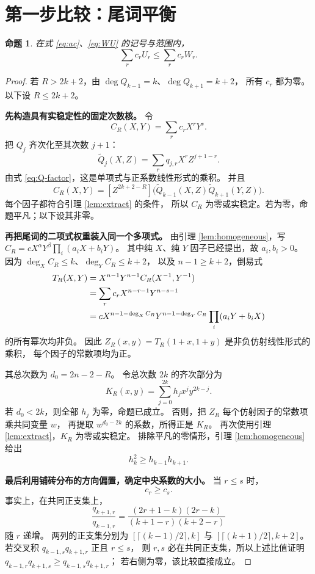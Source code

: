 \documentclass[UTF8,a4paper,11pt,fontset=none]{ctexart}
\numberwithin{equation}{section}
\theoremstyle{paperplain}
\newtheorem{proposition}[theorem]{命题}
\theoremstyle{definition}
\theoremstyle{remark}
\begin{document}
\section{第一步比较：尾词平衡}\label{sec:balance}
\begin{proposition}\label{prop:balance}
在式 \eqref{eq:ac}、\eqref{eq:WU} 的记号与范围内，
\begin{equation}\label{eq:balance}
\sum_r c_rU_r\le\sum_r c_rW_r.
\end{equation}
\end{proposition}
\begin{proof}
若 $R>2k+2$，由 $\deg Q_{k-1}=k$、$\deg Q_{k+1}=k+2$，
所有 $c_r$ 都为零。以下设 $R\le2k+2$。

\textbf{先构造具有实稳定性的固定次数核。}
令
\[
C_R(X,Y)=\sum_r c_rX^rY^s.
\]
把 $Q_j$ 齐次化至其次数 $j+1$：
\[
\widetilde Q_j(X,Z)=\sum_rq_{j,r}X^rZ^{j+1-r}.
\]
由式 \eqref{eq:Q-factor}，这是单项式与正系数线性形式的乘积。
并且
\[
C_R(X,Y)=[Z^{2k+2-R}]
\bigl(\widetilde Q_{k-1}(X,Z)\widetilde Q_{k+1}(Y,Z)\bigr).
\]
每个因子都符合引理 \ref{lem:extract} 的条件，
所以 $C_R$ 为零或实稳定。若为零，命题平凡；以下设其非零。

\textbf{再把尾词的二项式权重装入同一个多项式。}
由引理 \ref{lem:homogeneous}，写
$C_R=cX^\alpha Y^\beta\prod_i(a_iX+b_iY)$。
其中纯 $X$、纯 $Y$ 因子已经提出，故 $a_i,b_i>0$。
因为 $\deg_X C_R\le k$、$\deg_Y C_R\le k+2$，
以及 $n-1\ge k+2$，倒易式
\begin{align}
T_R(X,Y)
&=X^{n-1}Y^{n-1}C_R(X^{-1},Y^{-1})\notag\\
&=\sum_r c_rX^{n-r-1}Y^{n-s-1}\label{eq:T}\\
&=cX^{n-1-\deg_X C_R}Y^{n-1-\deg_Y C_R}
\prod_i(a_iY+b_iX)\notag
\end{align}
的所有幂次均非负。
因此 $Z_R(x,y)=T_R(1+x,1+y)$ 是非负仿射线性形式的乘积，
每个因子的常数项均为正。

其总次数为 $d_0=2n-2-R$。
令总次数 $2k$ 的齐次部分为
\[
K_R(x,y)=\sum_{j=0}^{2k}h_jx^jy^{2k-j}.
\]
若 $d_0<2k$，则全部 $h_j$ 为零，命题已成立。
否则，把 $Z_R$ 每个仿射因子的常数项乘共同变量 $w$，
再提取 $w^{d_0-2k}$ 的系数，所得正是 $K_R$。
再次使用引理 \ref{lem:extract}，$K_R$ 为零或实稳定。
排除平凡的零情形，引理 \ref{lem:homogeneous} 给出
\begin{equation}\label{eq:h-lc}
h_k^2\ge h_{k-1}h_{k+1}.
\end{equation}

\textbf{最后利用铺砖分布的方向偏置，确定中央系数的大小。}
当 $r\le s$ 时，
\begin{equation}\label{eq:c-bias}
c_r\ge c_s.
\end{equation}
事实上，在共同正支集上，
\[
\frac{q_{k+1,r}}{q_{k-1,r}}
=\frac{(2r+1-k)(2r-k)}{(k+1-r)(k+2-r)}
\]
随 $r$ 递增。
两列的正支集分别为
$[\lceil(k-1)/2\rceil,k]$ 与 $[\lceil(k+1)/2\rceil,k+2]$。
若交叉积 $q_{k-1,s}q_{k+1,r}$ 正且 $r\le s$，
则 $r,s$ 必在共同正支集，所以上述比值证明
$q_{k-1,r}q_{k+1,s}\ge q_{k-1,s}q_{k+1,r}$；
若右侧为零，该比较直接成立。


\end{proof}
\end{document}
